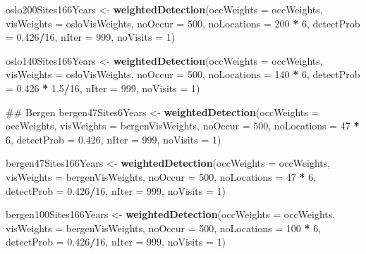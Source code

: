 \documentclass[]{article}
\newenvironment{Shaded}{\begin{snugshade}}{\end{snugshade}}
\newcommand{\KeywordTok}[1]{\textcolor[rgb]{0.13,0.29,0.53}{\textbf{#1}}}
\newcommand{\DataTypeTok}[1]{\textcolor[rgb]{0.13,0.29,0.53}{#1}}
\newcommand{\DecValTok}[1]{\textcolor[rgb]{0.00,0.00,0.81}{#1}}
\newcommand{\FloatTok}[1]{\textcolor[rgb]{0.00,0.00,0.81}{#1}}
\newcommand{\StringTok}[1]{\textcolor[rgb]{0.31,0.60,0.02}{#1}}
\newcommand{\OperatorTok}[1]{\textcolor[rgb]{0.81,0.36,0.00}{\textbf{#1}}}
\newcommand{\NormalTok}[1]{#1}
\begin{document}
\begin{Shaded}
\begin{Highlighting}[]
\NormalTok{oslo200Sites166Years <-}\StringTok{ }\KeywordTok{weightedDetection}\NormalTok{(}\DataTypeTok{occWeights =}\NormalTok{ occWeights, }\DataTypeTok{visWeights =}\NormalTok{ osloVisWeights, }
    \DataTypeTok{noOccur =} \DecValTok{500}\NormalTok{, }\DataTypeTok{noLocations =} \DecValTok{200} \OperatorTok{*}\StringTok{ }\DecValTok{6}\NormalTok{, }\DataTypeTok{detectProb =} \FloatTok{0.426}\OperatorTok{/}\DecValTok{16}\NormalTok{, }\DataTypeTok{nIter =} \DecValTok{999}\NormalTok{, }
    \DataTypeTok{noVisits =} \DecValTok{1}\NormalTok{)}

\NormalTok{oslo140Sites166Years <-}\StringTok{ }\KeywordTok{weightedDetection}\NormalTok{(}\DataTypeTok{occWeights =}\NormalTok{ occWeights, }\DataTypeTok{visWeights =}\NormalTok{ osloVisWeights, }
    \DataTypeTok{noOccur =} \DecValTok{500}\NormalTok{, }\DataTypeTok{noLocations =} \DecValTok{140} \OperatorTok{*}\StringTok{ }\DecValTok{6}\NormalTok{, }\DataTypeTok{detectProb =} \FloatTok{0.426} \OperatorTok{*}\StringTok{ }\FloatTok{1.5}\OperatorTok{/}\DecValTok{16}\NormalTok{, }\DataTypeTok{nIter =} \DecValTok{999}\NormalTok{, }
    \DataTypeTok{noVisits =} \DecValTok{1}\NormalTok{)}

\NormalTok{## Bergen}
\NormalTok{bergen47Sites6Years <-}\StringTok{ }\KeywordTok{weightedDetection}\NormalTok{(}\DataTypeTok{occWeights =}\NormalTok{ occWeights, }\DataTypeTok{visWeights =}\NormalTok{ bergenVisWeights, }
    \DataTypeTok{noOccur =} \DecValTok{500}\NormalTok{, }\DataTypeTok{noLocations =} \DecValTok{47} \OperatorTok{*}\StringTok{ }\DecValTok{6}\NormalTok{, }\DataTypeTok{detectProb =} \FloatTok{0.426}\NormalTok{, }\DataTypeTok{nIter =} \DecValTok{999}\NormalTok{, }\DataTypeTok{noVisits =} \DecValTok{1}\NormalTok{)}

\NormalTok{bergen47Sites166Years <-}\StringTok{ }\KeywordTok{weightedDetection}\NormalTok{(}\DataTypeTok{occWeights =}\NormalTok{ occWeights, }\DataTypeTok{visWeights =}\NormalTok{ bergenVisWeights, }
    \DataTypeTok{noOccur =} \DecValTok{500}\NormalTok{, }\DataTypeTok{noLocations =} \DecValTok{47} \OperatorTok{*}\StringTok{ }\DecValTok{6}\NormalTok{, }\DataTypeTok{detectProb =} \FloatTok{0.426}\OperatorTok{/}\DecValTok{16}\NormalTok{, }\DataTypeTok{nIter =} \DecValTok{999}\NormalTok{, }
    \DataTypeTok{noVisits =} \DecValTok{1}\NormalTok{)}

\NormalTok{bergen100Sites166Years <-}\StringTok{ }\KeywordTok{weightedDetection}\NormalTok{(}\DataTypeTok{occWeights =}\NormalTok{ occWeights, }\DataTypeTok{visWeights =}\NormalTok{ bergenVisWeights, }
    \DataTypeTok{noOccur =} \DecValTok{500}\NormalTok{, }\DataTypeTok{noLocations =} \DecValTok{100} \OperatorTok{*}\StringTok{ }\DecValTok{6}\NormalTok{, }\DataTypeTok{detectProb =} \FloatTok{0.426}\OperatorTok{/}\DecValTok{16}\NormalTok{, }\DataTypeTok{nIter =} \DecValTok{999}\NormalTok{, }
    \DataTypeTok{noVisits =} \DecValTok{1}\NormalTok{)}



\end{Highlighting}
\end{Shaded}
\end{document}
